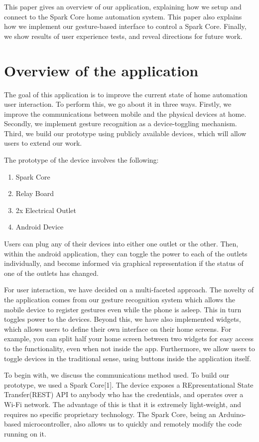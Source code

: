 \documentclass[journal]{IEEEtran}
\begin{document}
This paper gives an overview of our application, explaining how we setup and connect to the Spark Core home automation system. This paper also explains how we implement our gesture-based interface to control a Spark Core. Finally, we  show results of user experience tests, and reveal directions for future work.
	
\section{Overview of the application}
The goal of this application is to improve the current state of home automation user interaction. To perform this, we go about it in three ways. Firstly, we improve the communications between mobile and the physical devices at home. Secondly, we implement gesture recognition as a device-toggling mechanism. Third, we build our prototype using publicly available devices, which will allow users to extend our work.  

The prototype of the device involves the following:
\begin{enumerate}
	\item Spark Core
	\item Relay Board
	\item 2x Electrical Outlet
	\item Android Device
\end{enumerate}

Users can plug any of their devices into either one outlet or the other. Then, within the android application, they can toggle the power to each of the outlets individually, and become informed via graphical representation if the status of one of the outlets has changed.

For user interaction, we have decided on a multi-faceted approach. The novelty of the application comes from our gesture recognition system which allows the mobile device to register gestures even while the phone is asleep. This in turn toggles power to the devices.  Beyond this, we have also implemented widgets, which allows users to define their own interface on their home screens. For example, you can split half your home screen between two widgets for easy access to the functionality, even when not inside the app. Furthermore, we allow users to toggle devices in the traditional sense, using buttons inside the application itself. 

To begin with, we discuss the communications method used. To build our prototype, we used a Spark Core[1]. The device exposes a REpresentational State Transfer(REST) API to anybody who has the credentials, and operates over a Wi-Fi network. The advantage of this is that it is extremely light-weight, and requires no specific proprietary technology. The Spark Core, being an Arduino-based microcontroller, also allows us to quickly and remotely modify the code running on it. 
\end{document}
